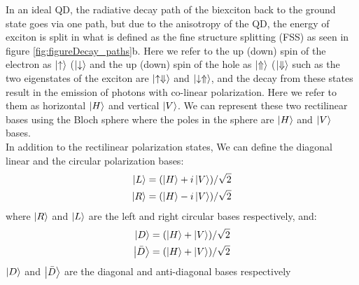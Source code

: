 	In an ideal QD, the radiative decay path of the biexciton back to the ground state goes via one path, but due to the anisotropy of the QD, the energy of exciton is split in what is defined as the fine structure splitting (FSS) as seen in figure \ref{fig:figureDecay_paths}b. Here we refer to the up (down) spin of the electron as $\ket{\uparrow}$ ($\ket{\downarrow}$ and the up (down) spin of the hole as $\ket{\Uparrow}$ ($\ket{\Downarrow}$ such as the two eigenstates of the exciton are  $\ket{\uparrow\Downarrow}$ and $\ket{\downarrow\Uparrow}$, and the decay from these states result in the emission of photons with co-linear polarization. Here we refer to them as horizontal $\ket{H}$ and vertical $\ket{V}$. We can represent these two rectilinear bases using the Bloch sphere where the poles in the sphere are $\ket{H}$ and $\ket{V}$ bases.\\
	
	In addition to the rectilinear polarization states, We can define the diagonal linear and
	the circular polarization bases: 
	\begin{equation}
		\begin{split}
			\ket{L}=(\ket{H}+i\ket{V})/\sqrt{2} \\
			\ket{R}=(\ket{H}-i\ket{V})/\sqrt{2}
		\end{split}
	\end{equation}
	where $\ket{R}$ and $\ket{L}$ are the left and right circular bases respectively, and:
	\begin{equation}
		\begin{split}
			\ket{D}=(\ket{H}+\ket{V})/\sqrt{2}\\
			\ket{\bar{D}}=(\ket{H}+\ket{V})/\sqrt{2}
		\end{split}
	\end{equation}
	$\ket{D}$ and $\ket{\bar{D}}$ are the diagonal and anti-diagonal bases respectively
	
